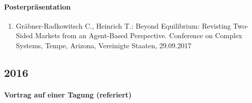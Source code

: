 \paragraph{Posterpräsentation}
\begin{enumerate}
	\item Gräbner-Radkowitsch C., Heinrich T.: Beyond Equilibrium: Revisting Two-Sided Markets from an Agent-Based Perspective. Conference on Complex Systems, Tempe, Arizona, Vereinigte Staaten, 29.09.2017
\end{enumerate}
\subsection*{2016}
\paragraph{Vortrag auf einer Tagung (referiert)}
